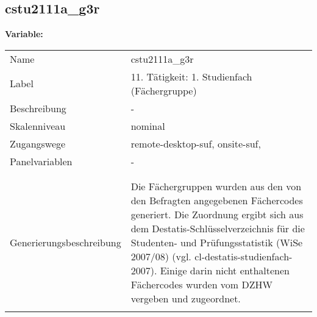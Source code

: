 	
	
	\subsection{cstu2111a\_g3r}
	\label{subSection:cstu2111a_g3r}

	\noindent\textbf{Variable:}\\
		\begin{tabular}{lL{11.3cm}}
			\label{tableVariable:cstu2111a_g3r}
			Name & cstu2111a\_g3r \\
			Label & 11. Tätigkeit: 1. Studienfach (Fächergruppe) \\
			Beschreibung & - \\
			Skalenniveau & nominal \\
			Zugangswege &
				remote-desktop-suf,
				onsite-suf,
 \\
			Panelvariablen & -
			 \\
			 \\
 \\
					Generierungsbeschreibung & Die Fächergruppen wurden aus den von den Befragten angegebenen Fächercodes generiert. Die Zuordnung ergibt sich aus dem Destatis-Schlüsselverzeichnis für die Studenten- und Prüfungsstatistik (WiSe 2007/08) (vgl. cl-destatis-studienfach-2007).  Einige darin nicht enthaltenen Fächercodes wurden vom DZHW vergeben und zugeordnet. 
				 \\	
			 \\
		\end{tabular}






